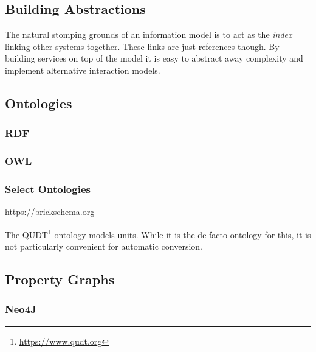 \subsection{Building Abstractions}

The natural stomping grounds of an information model is to act as the \textsl{index} linking other systems together. These links are just references though. By building services on top of the model it is easy to abstract away complexity and implement alternative interaction models.



\subsection{Ontologies}
\subsubsection{RDF}
\subsubsection{OWL}
\subsubsection{Select Ontologies}

\url{https://brickschema.org}



The QUDT\footnote{\url{https://www.qudt.org}} ontology models units. While it is the de-facto ontology for this, it is not particularly convenient for automatic conversion.

\subsection{Property Graphs}
\subsubsection{Neo4J}

